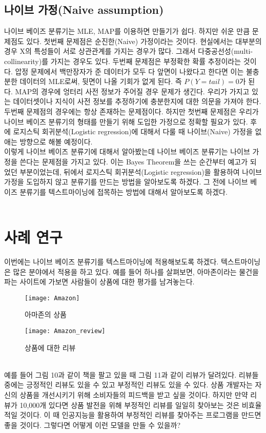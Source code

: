 \documentclass[a4paper]{oblivoir}
\begin{document}
\subsection{나이브 가정(Naive assumption)}
나이브 베이즈 분류기는 MLE, MAP를 이용하면 만들기가 쉽다. 하지만 쉬운 만큼 문제점도 있다. 첫번째 문제점은 순진한(Naive) 가정이라는 것이다. 현실에서는 대부분의 경우 X의 특성들이 서로 상관관계를 가지는 경우가 많다. 그래서 다중공선성(multi-collinearity)를 가지는 경우도 있다. 두번째 문제점은 부정확한 확률 추정이라는 것이다. 압정 문제에서 백만장자가 준 데이터가 모두 다 앞면이 나왔다고 한다면 이는 불충분한 데이터의 MLE로써, 뒷면이 나올 기회가 없게 된다. 즉 $P(Y=tail)=0$가 된다. MAP의 경우에 엉터리 사전 정보가 주어질 경우 문제가 생긴다. 우리가 가지고 있는 데이터셋이나 지식이 사전 정보를 추정하기에 충분한지에 대한 의문을 가져야 한다.\\
\indent 두번째 문제점의 경우에는 항상 존재하는 문제점이다. 하지만 첫번째 문제점은 우리가 나이브 베이즈 분류기의 형태를 만들기 위해 도입한 가정으로 정확할 필요가 있다. 후에 로지스틱 회귀분석(Logistic regression)에 대해서 다룰 때 나이브(Naive) 가정을 없애는 방향으로 해볼 예정이다. \\
\indent 이렇게 나이브 베이즈 분류기에 대해서 알아봤는데 나이브 베이즈 분류기는 나이브 가정을 쓴다는 문제점을 가지고 있다. 이는 Bayes Theorem을 쓰는 순간부터 예고가 되었던 부분이었는데, 뒤에서 로지스틱 회귀분석(Logistic regression)을 활용하여 나이브 가정을 도입하지 않고 분류기를 만드는 방법을 알아보도록 하겠다. 그 전에 나이브 베이즈 분류기를 텍스트마이닝에 접목하는 방법에 대해서 알아보도록 하겠다.\\\\
 
\section{사례 연구}
이번에는 나이브 베이즈 분류기를 텍스트마이닝에 적용해보도록 하겠다. 텍스트마이닝은 많은 분야에서 적용을 하고 있다. 예를 들어 하나를 살펴보면, 아마존이라는 물건을 파는 사이트에 가보면 사람들이 상품에 대한 평가를 남겨놓는다. \\
\begin{figure}[ht]\centering
\texttt{[image: Amazon]}\caption{아마존의 상품}\label{Fig:3-10}
\end{figure}
\begin{figure}[ht]\centering
\texttt{[image: Amazon\_review]}\caption{상품에 대한 리뷰}\label{Fig:3-11}
\end{figure}\\
\indent 예를 들어 그림 10과 같이 책을 팔고 있을 때 그림 11과 같이 리뷰가 달려있다. 리뷰들 중에는 긍정적인 리뷰도 있을 수 있고 부정적인 리뷰도 있을 수 있다. 상품 개발자는 자신의 상품을 개선시키기 위해 소비자들의 피드백을 받고 싶을 것이다. 하지만 만약 리뷰가 10,000개 있다면 상품 발전을 위해 부정적인 리뷰를 일일히 찾아보는 것은 비효율적일 것이다. 이 때 인공지능을 활용하여 부정적인 리뷰를 찾아주는 프로그램을 만드면 좋을 것이다. 그렇다면 어떻게 이런 모델을 만들 수 있을까?\\
\end{document}
